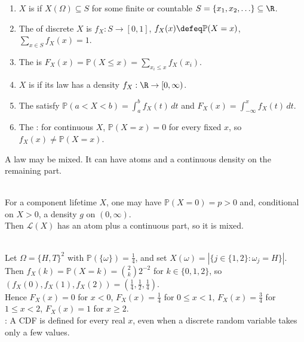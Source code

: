 \begin{definition} \label{def:discrete-and-continuous-random-variables} 
\begin{enumerate}[label=(\roman*)]
\setlength{\itemsep}{0pt}
\item $X$ is  if $X(\Omega)\subseteq S$ for some finite or countable $S=\{x_1,x_2,\ldots\}\subseteq\R$.
\item The  of discrete $X$ is $f_X:S\to[0,1]$, $f_X(x)\defeq\mathbb{P}(X=x)$, $\sum\limits_{x\in S}f_X(x)=1$.
\item The  is $F_X(x)=\mathbb{P}(X\leq x)=\sum\limits_{x_i\leq x}f_X(x_i)$.
\item $X$ is  if its law has a density $f_X:\R\to[0,\infty)$.
\item The  satisfy $\mathbb{P}(a<X<b)=\int_a^b f_X(t)\,dt$ and $F_X(x)=\int_{-\infty}^{x}f_X(t)\,dt$.
\item The : for continuous $X$, $\mathbb{P}(X=x)=0$ for every fixed $x$, so $f_X(x)\neq\mathbb{P}(X=x)$.
\end{enumerate}
A law may be mixed. It can have atoms and a continuous density on the remaining part.
\end{definition}

\begin{remark} \label{rem:mixed-random-variables-source-example} \\
For a component lifetime $X$, one may have $\mathbb{P}(X=0)=p>0$ and, conditional on $X>0$, a density $g$ on $(0,\infty)$.\\
Then $\mathcal{L}(X)$ has an atom plus a continuous part, so it is mixed.
\end{remark}

\begin{example} \label{ex:two-coin-count-random-variable} \\
Let $\Omega=\{H,T\}^2$ with $\mathbb{P}(\{\omega\})=\frac{1}{4}$, and set $X(\omega)=|\{j\in\{1,2\}:\omega_j=H\}|$.\\
Then $f_X(k)=\mathbb{P}(X=k)=\binom{2}{k}2^{-2}$ for $k\in\{0,1,2\}$, so $(f_X(0),f_X(1),f_X(2))=(\frac{1}{4},\frac{1}{2},\frac{1}{4})$.\\
Hence $F_X(x)=0$ for $x<0$, $F_X(x)=\frac{1}{4}$ for $0\leq x<1$, $F_X(x)=\frac{3}{4}$ for $1\leq x<2$, $F_X(x)=1$ for $x\geq2$.\\
: A CDF is defined for every real $x$, even when a discrete random variable takes only a few values.
\end{example}

